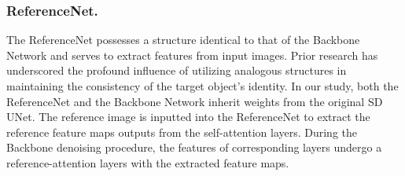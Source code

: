 \subsubsection{ReferenceNet.} 
\label{sec:referencenet}
The ReferenceNet possesses a structure identical to that of the Backbone Network and serves to extract features from input images. Prior research\cite{googletryon, animate_anyone} has underscored the profound influence of utilizing analogous structures in maintaining the consistency of the target object's identity. In our study, both the ReferenceNet and the Backbone Network inherit weights from the original SD UNet. The reference image is inputted into the ReferenceNet to extract the reference feature maps outputs from the self-attention layers. During the Backbone denoising procedure, the features of corresponding layers undergo a reference-attention layers with the extracted feature maps.

